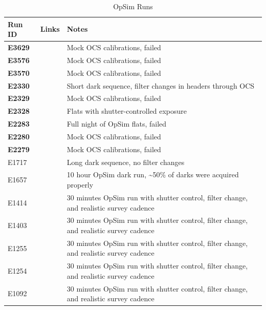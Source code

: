\begin{table}[ht]\label{table:runs_opSim}
\centering
\caption{OpSim Runs}
\begin{tabular}{|p{1.5cm}|p{2.9cm}|p{9cm}|}
\hline
Run ID & Links & Notes \\ \hline


\textbf{E3629} & & Mock OCS calibrations, failed\\ \hline 
\textbf{E3576} & & Mock OCS calibrations, failed\\ \hline 
\textbf{E3570} & & Mock OCS calibrations, failed\\ \hline 
\textbf{E2330} & & Short dark sequence, filter changes in headers through OCS \\ \hline
\textbf{E2329} & & Mock OCS calibrations, failed\\ \hline 
\textbf{E2328} & & Flats with shutter-controlled exposure \\ \hline
\textbf{E2283} & & Full night of OpSim flats, failed \\ \hline
\textbf{E2280} & & Mock OCS calibrations, failed\\ \hline 
\textbf{E2279} & & Mock OCS calibrations, failed\\ \hline 
E1717 & & Long dark sequence, no filter changes \\ \hline
E1657 & & 10 hour OpSim dark run, \textasciitilde50\% of darks were acquired properly \\ \hline
E1414 & & 30 minutes OpSim run with shutter control, filter change, and realistic survey cadence \\ \hline
E1403 & & 30 minutes OpSim run with shutter control, filter change, and realistic survey cadence \\ \hline
E1255 & & 30 minutes OpSim run with shutter control, filter change, and realistic survey cadence \\ \hline
E1254 & & 30 minutes OpSim run with shutter control, filter change, and realistic survey cadence \\ \hline
E1092 & & 30 minutes OpSim run with shutter control, filter change, and realistic survey cadence \\ \hline

\end{tabular}
\end{table}

